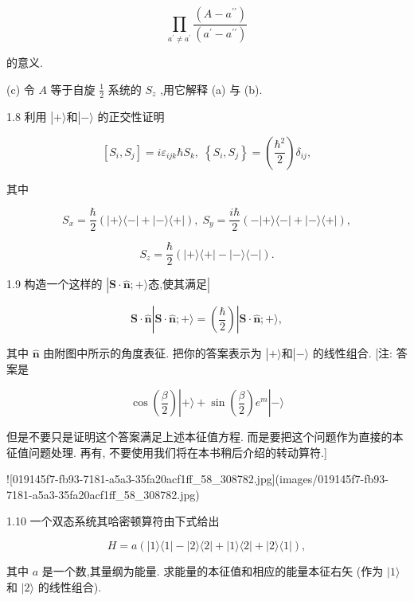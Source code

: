 \documentclass[lang=cn,newtx,10pt,scheme=chinese,thmcnt=section]{elegantbook}
\begin{document}
$$
\mathop{\prod }\limits_{{{a}^{\prime } \neq {a}^{\prime }}}\frac{\left( A - {a}^{\prime \prime }\right) }{\left( {a}^{\prime } - {a}^{\prime \prime }\right) }
$$

的意义.

(c) 令 $A$ 等于自旋 $\frac{1}{2}$ 系统的 ${S}_{z}$ ,用它解释 (a) 与 (b).

1.8 利用 $\left| {+\rangle \text{和}}\right| - \rangle$ 的正交性证明

$$
\left\lbrack {{S}_{i},{S}_{j}}\right\rbrack = i{\varepsilon }_{ijk}\hbar {S}_{k},\;\left\{ {{S}_{i},{S}_{j}}\right\} = \left( \frac{{\hbar }^{2}}{2}\right) {\delta }_{ij},
$$

其中

$$
{S}_{x} = \frac{\hbar }{2}\left( {\left| {+\rangle \langle - }\right| + \left| {-\rangle \langle + }\right| }\right) ,\;{S}_{y} = \frac{i\hbar }{2}\left( {-\left| {+\rangle \langle - }\right| + \left| {-\rangle \langle + }\right| }\right) ,
$$

$$
{S}_{z} = \frac{\hbar }{2}\left( {\left| {+\rangle \langle + }\right| - \left| {-\rangle \langle - }\right| }\right) .
$$

1.9 构造一个这样的 $\left| {\mathbf{S} \cdot \widehat{\mathbf{n}}; + \rangle \text{态,使其满足}}\right|$

$$
\mathbf{S} \cdot \widehat{\mathbf{n}}\left| {\mathbf{S} \cdot \widehat{\mathbf{n}}; + \rangle = \left( \frac{\hbar }{2}\right) }\right| \mathbf{S} \cdot \widehat{\mathbf{n}}; + \rangle ,
$$

其中 $\widehat{\mathbf{n}}$ 由附图中所示的角度表征. 把你的答案表示为 $\left| {+\rangle \text{和}}\right| - \rangle$ 的线性组合. [注: 答案是

$$
\cos \left( \frac{\beta }{2}\right) \left| {+\rangle + \sin \left( \frac{\beta }{2}\right) {e}^{m}}\right| - \rangle
$$

但是不要只是证明这个答案满足上述本征值方程. 而是要把这个问题作为直接的本征值问题处理. 再有, 不要使用我们将在本书稍后介绍的转动算符.]

![019145f7-fb93-7181-a5a3-35fa20acf1ff_58_308782.jpg](images/019145f7-fb93-7181-a5a3-35fa20acf1ff_58_308782.jpg)

1.10 一个双态系统其哈密顿算符由下式给出

$$
H = a\left( {\left| {1\rangle \langle 1}\right| - \left| {2\rangle \langle 2}\right| + \left| {1\rangle \langle 2}\right| + \left| {2\rangle \langle 1}\right| }\right) ,
$$

其中 $a$ 是一个数,其量纲为能量. 求能量的本征值和相应的能量本征右矢 (作为 $|1\rangle$ 和 $|2\rangle$ 的线性组合).
\end{document}
